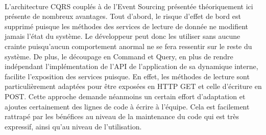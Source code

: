 \paragraph{}
\label{par:Organisation conclusion}
L'architecture CQRS couplés à de l'Event Sourcing présentée théoriquement ici présente de nombreux avantages.
Tout d'abord, le risque d'effet de bord est supprimé puisque les méthodes des services de lecture de donnée ne modifient jamais l'état du système.
Le développeur peut donc les utiliser sans aucune crainte puisqu'aucun comportement anormal ne se fera ressentir sur le reste du système.
De plus, le découpage en Command et Query, en plus de rendre indépendant l'implémentation de l'API de l'application de sa dynamique interne, facilite l'exposition des services puisque.
En effet, les méthodes de lecture sont particulièrement adaptées pour être exposées en HTTP GET et celle d'écriture en POST.
Cette approche demande néanmoins un certain effort d'adaptation et ajoutes certainement des lignes de code à écrire à l'équipe.
Cela est facilement rattrapé par les bénéfices au niveau de la maintenance du code qui est très expressif, ainsi qu'au niveau de l'utilisation.
